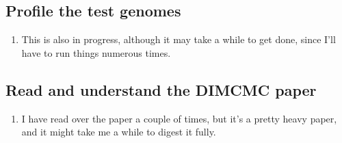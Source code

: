 \documentclass[12 pt]{article}
\begin{document}
	\subsection{Profile the test genomes}
	\begin{enumerate}
		\item This is also in progress, although it may take a while to get done, since I'll have to run things numerous times.
	\end{enumerate}
	
	\subsection{Read and understand the DIMCMC paper}
	\begin{enumerate}
		\item I have read over the paper a couple of times, but it's a pretty heavy paper, and it might take me a while to digest it fully.
	\end{enumerate}
	
\end{document}
